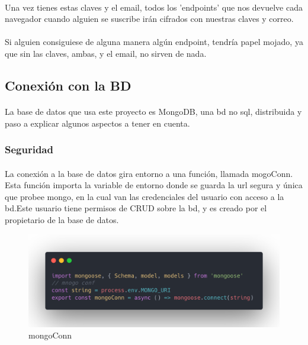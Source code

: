 \documentclass[a4paper]{article}
\begin{document}
 \paragraph{}
Una vez tienes estas claves y el email, todos los 'endpoints' que nos devuelve cada 
navegador cuando alguien se suscribe irán cifrados con nuestras claves y correo.
\paragraph{}
Si alguien consiguiese de alguna manera algún endpoint,
 tendría papel mojado, ya que sin las claves, ambas, 
 y el email, no sirven de nada.
 \subsection[Base de Datos]{Conexión con la BD}
 \paragraph{}
 La base de datos que usa este proyecto es MongoDB, una bd no sql, distribuida y 
 paso a explicar algunos aspectos a tener en cuenta.
 \subsubsection{Seguridad}
 \paragraph{}
   La conexión a la base de datos gira entorno a una función, llamada mogoConn.
   Esta función importa la variable de entorno donde se guarda la url segura y 
   única que probee mongo, en la cual van las credenciales del usuario con 
   acceso a la bd.Este usuario tiene permisos de CRUD sobre la bd, y es creado 
   por el propietario de la base de datos.
   \begin{figure}[ht]
      \includegraphics[width=\linewidth]{./assets/mongo-con.png}
      \centering
      \caption{mongoConn}
      \label{fig:mongo-con}
   \end{figure}
\end{document}

